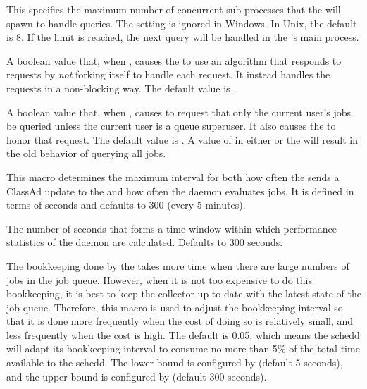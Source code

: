 \begin{description}
\label{param:ScheddQueryWorkers}
\item[\Macro{SCHEDD\_QUERY\_WORKERS}]
  This specifies the maximum number of concurrent sub-processes that
  the  will spawn to handle queries.  The setting is
  ignored in Windows.  In Unix, the default is 8.  If the limit is
  reached, the next query will be handled in the 's main
  process.

\label{param:CondorQUseV3Protocol}
\item[\Macro{CONDOR\_Q\_USE\_V3\_PROTOCOL}]
  A boolean value that, when ,
  causes the  to use an algorithm that responds to 
   requests by \emph{not} forking itself to handle each request.
  It instead handles the requests in a non-blocking way.
  The default value is .

\label{param:CondorQOnlyMyJobs}
\item[\Macro{CONDOR\_Q\_ONLY\_MY\_JOBS}]
  A boolean value that, when ,
  causes  to request that only the current user's jobs be queried
  unless the current user is a queue superuser.  It also causes the
   to honor that request.
  The default value is . A value of  in either  or
  the  will result in the old behavior of querying all jobs.

\label{param:ScheddInterval}
\item[\Macro{SCHEDD\_INTERVAL}]
  This macro determines the maximum interval for both how often the
   sends a ClassAd update to the  and
  how often the  daemon evaluates jobs.  It is defined
  in terms of seconds and defaults to 300 (every 5 minutes).

\label{param:WindowedStatWidth}
\item[\Macro{WINDOWED\_STAT\_WIDTH}]
  The number of seconds that forms a time window within which performance
  statistics of the  daemon are calculated.
  Defaults to 300 seconds.

\label{param:ScheddIntervalTimeslice}
\item[\Macro{SCHEDD\_INTERVAL\_TIMESLICE}]
  The bookkeeping done by the
   takes more time when there are large numbers of jobs
  in the job queue.  However, when it is not too expensive to do this
  bookkeeping, it is best to keep the collector up to date with the
  latest state of the job queue.  Therefore, this macro is used to
  adjust the bookkeeping interval so that it is done more frequently
  when the cost of doing so is relatively small, and less frequently
  when the cost is high.  The default is 0.05, which means the schedd
  will adapt its bookkeeping interval to consume no more than 5\% of the
  total time available to the schedd.  The lower bound is configured by
   (default 5 seconds), and the upper bound
  is configured by  (default 300 seconds).



\end{description}
